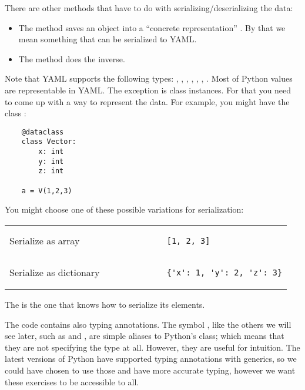 There are other methods that have to do with serializing/deserializing the data:

\begin{itemize}
	\item The method  saves an object into a ``concrete representation'' \ConcreteRepr.
	      By that we mean something that can be serialized to YAML.
	\item The method  does the inverse.
\end{itemize}

Note that YAML supports the following types: , , , ,
, , .
Most of Python values are representable in YAML.
The exception is class instances.
For that you need to come up with a way to represent the data.
For example, you might have the class :

\begin{verbatim}
    @dataclass
    class Vector:
        x: int
        y: int
        z: int

    a = V(1,2,3)
\end{verbatim}

You might choose one of these possible variations for serialization:

\begin{tabular}{ll}
	Serialize as array      &
	\begin{minipage}{4cm}
		\begin{verbatim}
            [1, 2, 3]
        \end{verbatim}
	\end{minipage} \\
	Serialize as dictionary &
	\begin{minipage}{4cm}
		\begin{verbatim}
            {'x': 1, 'y': 2, 'z': 3}
        \end{verbatim}
	\end{minipage}
\end{tabular}

The \Setoid is the one that knows how to serialize its elements.

The code contains also typing annotations.
The symbol \Element, like the others we will see later, such as \Object and \Morphism, are simple aliases to Python's  class; which means that they are not specifying the type at all.
However, they are useful for intuition.
The latest versions of Python have supported typing annotations with generics, so we could have chosen to use those and have more accurate typing, however we want these exercises to be accessible to all.

